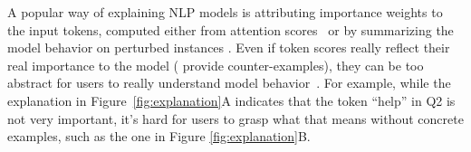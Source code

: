 A popular way of explaining NLP models is attributing importance weights to the input tokens, computed either from attention scores~\cite{wiegreffe2019attention} or by summarizing the model behavior on perturbed instances \cite{Ribeiro2016WhySI, NIPS2017_7062}.
Even if token scores really reflect their real importance to the model (\citet{pruthi2020learning} provide counter-examples), they can be too abstract for users to really understand model behavior~\cite{miller}. For example, while the explanation in Figure~\ref{fig:explanation}A indicates that the token ``help'' in Q2 is not very important, it's hard for users to grasp what that means without concrete examples, such as the one in Figure \ref{fig:explanation}B. 

